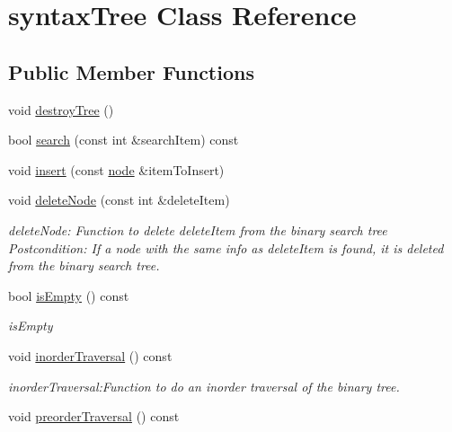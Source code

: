 \hypertarget{classsyntaxTree}{\section{syntax\-Tree \-Class \-Reference}
\label{classsyntaxTree}
}
\subsection*{\-Public \-Member \-Functions}
\begin{DoxyCompactItemize}
\item 
void \hyperlink{classsyntaxTree_a96dfc5c8a6e58a037b3a2a540349acd0}{destroy\-Tree} ()
\item 
bool \hyperlink{classsyntaxTree_a877596bd5405c307a29a65889e4fbf89}{search} (const int \&search\-Item) const 
\item 
void \hyperlink{classsyntaxTree_ade062a0bf860a6b217738e4df84a3845}{insert} (const \hyperlink{classnode}{node} \&item\-To\-Insert)
\item 
void \hyperlink{classsyntaxTree_ad12b7769cf5ccb9f1d769a519d1d264d}{delete\-Node} (const int \&delete\-Item)
\begin{DoxyCompactList}\small\item\em delete\-Node\-: \-Function to delete delete\-Item from the binary search tree \-Postcondition\-: \-If a node with the same info as delete\-Item is found, it is deleted from the binary search tree. \end{DoxyCompactList}\item 
bool \hyperlink{classsyntaxTree_a197b8de3714d444fd55bb55ec371bae5}{is\-Empty} () const 
\begin{DoxyCompactList}\small\item\em is\-Empty \end{DoxyCompactList}\item 
\hypertarget{classsyntaxTree_a964ca5e61a783f7a58bd5e30293dd674}{void \hyperlink{classsyntaxTree_a964ca5e61a783f7a58bd5e30293dd674}{inorder\-Traversal} () const }\label{classsyntaxTree_a964ca5e61a783f7a58bd5e30293dd674}

\begin{DoxyCompactList}\small\item\em inorder\-Traversal\-:\-Function to do an inorder traversal of the binary tree. \end{DoxyCompactList}\item 
\hypertarget{classsyntaxTree_ad4af7ee2a407fad774ae2315bb1abf9f}{void \hyperlink{classsyntaxTree_ad4af7ee2a407fad774ae2315bb1abf9f}{preorder\-Traversal} () const }\label{classsyntaxTree_ad4af7ee2a407fad774ae2315bb1abf9f}


\end{DoxyCompactItemize}
